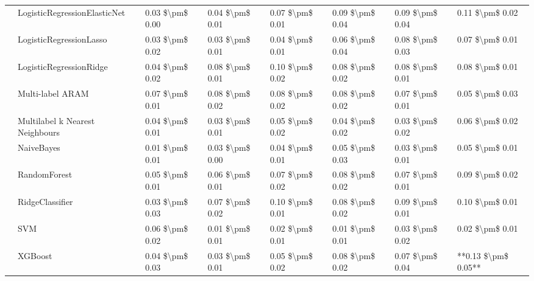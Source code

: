 \begin{tabular}{llllllll}
   & LogisticRegressionElasticNet &  0.03 \$\textbackslash pm\$ 0.00 &           0.04 \$\textbackslash pm\$ 0.01 &       0.07 \$\textbackslash pm\$ 0.01 &        0.09 \$\textbackslash pm\$ 0.04 &                         0.09 \$\textbackslash pm\$ 0.04 &      0.11 \$\textbackslash pm\$ 0.02 \\
   & LogisticRegressionLasso &  0.03 \$\textbackslash pm\$ 0.02 &           0.03 \$\textbackslash pm\$ 0.01 &       0.04 \$\textbackslash pm\$ 0.01 &        0.06 \$\textbackslash pm\$ 0.04 &                         0.08 \$\textbackslash pm\$ 0.03 &      0.07 \$\textbackslash pm\$ 0.01 \\
   & LogisticRegressionRidge &  0.04 \$\textbackslash pm\$ 0.02 &           0.08 \$\textbackslash pm\$ 0.01 &       0.10 \$\textbackslash pm\$ 0.02 &        0.08 \$\textbackslash pm\$ 0.02 &                         0.08 \$\textbackslash pm\$ 0.01 &      0.08 \$\textbackslash pm\$ 0.01 \\
   & Multi-label ARAM &  0.07 \$\textbackslash pm\$ 0.01 &           0.08 \$\textbackslash pm\$ 0.02 &       0.08 \$\textbackslash pm\$ 0.02 &        0.08 \$\textbackslash pm\$ 0.02 &                         0.07 \$\textbackslash pm\$ 0.01 &      0.05 \$\textbackslash pm\$ 0.03 \\
   & Multilabel k Nearest Neighbours &  0.04 \$\textbackslash pm\$ 0.01 &           0.03 \$\textbackslash pm\$ 0.01 &       0.05 \$\textbackslash pm\$ 0.02 &        0.04 \$\textbackslash pm\$ 0.02 &                         0.03 \$\textbackslash pm\$ 0.02 &      0.06 \$\textbackslash pm\$ 0.02 \\
   & NaiveBayes &  0.01 \$\textbackslash pm\$ 0.01 &           0.03 \$\textbackslash pm\$ 0.00 &       0.04 \$\textbackslash pm\$ 0.01 &        0.05 \$\textbackslash pm\$ 0.03 &                         0.03 \$\textbackslash pm\$ 0.01 &      0.05 \$\textbackslash pm\$ 0.01 \\
   & RandomForest &  0.05 \$\textbackslash pm\$ 0.01 &           0.06 \$\textbackslash pm\$ 0.01 &       0.07 \$\textbackslash pm\$ 0.02 &        0.08 \$\textbackslash pm\$ 0.02 &                         0.07 \$\textbackslash pm\$ 0.01 &      0.09 \$\textbackslash pm\$ 0.02 \\
   & RidgeClassifier &  0.03 \$\textbackslash pm\$ 0.03 &           0.07 \$\textbackslash pm\$ 0.02 &       0.10 \$\textbackslash pm\$ 0.01 &        0.08 \$\textbackslash pm\$ 0.02 &                         0.09 \$\textbackslash pm\$ 0.01 &      0.10 \$\textbackslash pm\$ 0.01 \\
   & SVM &  0.06 \$\textbackslash pm\$ 0.02 &           0.01 \$\textbackslash pm\$ 0.01 &       0.02 \$\textbackslash pm\$ 0.01 &        0.01 \$\textbackslash pm\$ 0.01 &                         0.03 \$\textbackslash pm\$ 0.02 &      0.02 \$\textbackslash pm\$ 0.01 \\
   & XGBoost &  0.04 \$\textbackslash pm\$ 0.03 &           0.03 \$\textbackslash pm\$ 0.01 &       0.05 \$\textbackslash pm\$ 0.02 &        0.08 \$\textbackslash pm\$ 0.02 &                         0.07 \$\textbackslash pm\$ 0.04 &  **0.13 \$\textbackslash pm\$ 0.05** \\
\bottomrule
\end{tabular}
